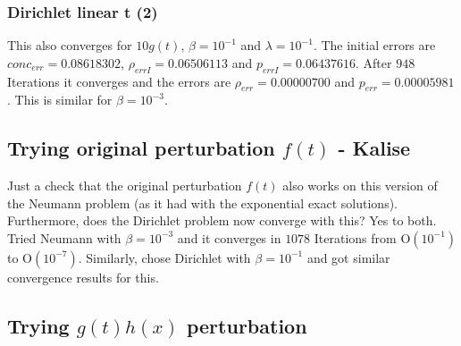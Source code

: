 \documentclass[11pt, a4paper]{article}
\theoremstyle{definition}
\begin{document}
\subsubsection*{Dirichlet linear t (2)}
This also converges for $10 g(t)$, $\beta =10^{-1}$ and $\lambda = 10^{-1}$.
The initial errors are $conc_{err} = 0.08618302$, $\rho_{errI} = 0.06506113$ and $p_{errI}=0.06437616$. After $948$ Iterations it converges and the errors are $\rho_{err} = 0.00000700$ and $p_{err} = 0.00005981$. This is similar for $\beta = 10^{-3}$.

\subsection*{Trying original perturbation $f(t)$ - Kalise}
Just a check that the original perturbation $f(t)$ also works on this version of the Neumann problem (as it had with the exponential exact solutions). Furthermore, does the Dirichlet problem now converge with this?
Yes to both. Tried Neumann with $\beta = 10^{-3}$ and it converges in $1078$ Iterations from O$(10^{-1})$ to O$(10^{-7})$.
Similarly, chose Dirichlet with $\beta = 10^{-1}$ and got similar convergence results for this.



\subsection*{Trying $g(t)h(x)$ perturbation}
\end{document}
